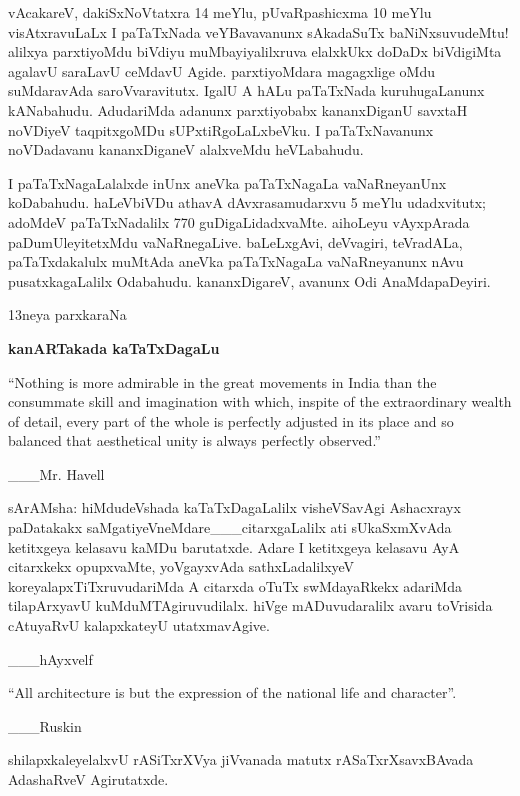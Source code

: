 \documentclass[11pt,a4size]{article}
\begin{document}
vAcakareV, dakiSxNoVtatxra 14 meYlu, pUvaRpashicxma 10 meYlu
visAtxravuLaLx I paTaTxNada veYBavavanunx sAkadaSuTx baNiNxsuvudeMtu!
alilxya parxtiyoMdu biVdiyu muMbayiyalilxruva elalxkUkx doDaDx
biVdigiMta agalavU saraLavU ceMdavU Agide. parxtiyoMdara magagxlige
oMdu suMdaravAda saroVvaravitutx. IgalU A hALu paTaTxNada
kuruhugaLanunx kANabahudu. AdudariMda adanunx parxtiyobabx
kananxDiganU savxtaH noVDiyeV taqpitxgoMDu sUPxtiRgoLaLxbeVku. I
paTaTxNavanunx noVDadavanu kananxDiganeV alalxveMdu heVLabahudu.

I paTaTxNagaLalalxde inUnx aneVka paTaTxNagaLa vaNaRneyanUnx
koDabahudu. haLeVbiVDu athavA dAvxrasamudarxvu 5 meYlu udadxvitutx;
adoMdeV paTaTxNadalilx 770 guDigaLidadxvaMte. aihoLeyu vAyxpArada
paDumUleyitetxMdu vaNaRnegaLive. baLeLxgAvi, deVvagiri, teVradALa,
paTaTxdakalulx muMtAda aneVka paTaTxNagaLa vaNaRneyanunx nAvu
pusatxkagaLalilx Odabahudu. kananxDigareV, avanunx Odi AnaMdapaDeyiri.

\newpage

\begin{center}
{\Huge 13neya parxkaraNa}

\smallskip
\textbf{\LARGE kanARTakada kaTaTxDagaLu}
\end{center} 

{
\rm
``Nothing is more admirable in the great movements in India than the
consummate skill and imagination with which, inspite of the
extraordinary wealth of detail, every part of the whole is perfectly
adjusted in its place and so balanced that aesthetical unity is always
perfectly observed.''

\hfill \_\_\_Mr. Havell}

\medskip
sArAMsha: hiMdudeVshada kaTaTxDagaLalilx visheVSavAgi Ashacxrayx
paDatakakx saMgatiyeVneMdare\_\_\_citarxgaLalilx ati sUkaSxmXvAda
ketitxgeya kelasavu kaMDu barutatxde. Adare I ketitxgeya kelasavu AyA
citarxkekx opupxvaMte, yoVgayxvAda sathxLadalilxyeV
koreyalapxTiTxruvudariMda A citarxda oTuTx swMdayaRkekx adariMda
tilapArxyavU kuMduMTAgiruvudilalx. hiVge mADuvudaralilx avaru
toVrisida cAtuyaRvU kalapxkateyU utatxmavAgive.

\hfill \_\_\_hAyxvelf

\medskip
{
\rm

``All architecture is but the expression of the national life and
character''.

\hfill \_\_\_Ruskin}

\medskip
shilapxkaleyelalxvU rASiTxrXVya jiVvanada matutx rASaTxrXsavxBAvada
AdashaRveV Agirutatxde.
\end{document}
